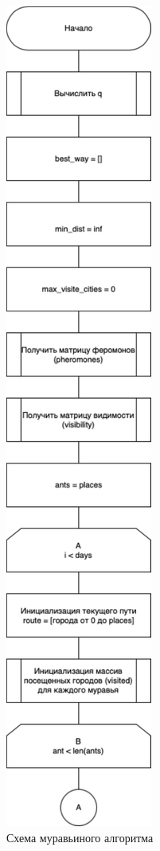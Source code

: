 \begin{figure}[h]
    \centering
    \includegraphics[width=0.25\linewidth]{img/ant_alg_part1.pdf}
    \caption{Схема муравьиного алгоритма}
    \label{img:brute2}
\end{figure}
\noindent


